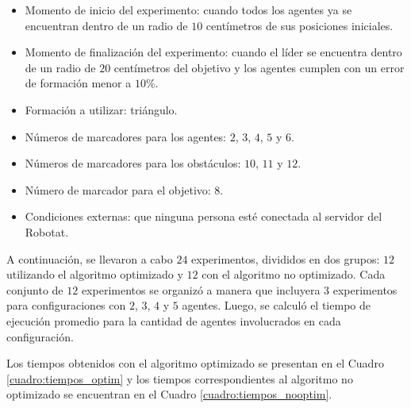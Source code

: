 \begin{itemize}
	\item Momento de inicio del experimento: cuando todos los agentes ya se encuentran dentro de un radio de $10$ centímetros de sus posiciones iniciales.
	\item  Momento de finalización del experimento: cuando el líder se encuentra dentro de un radio de $20$ centímetros del objetivo y los agentes cumplen con un error de formación menor a $10\%$. 
	\item Formación a utilizar: triángulo.
	\item Números de marcadores para los agentes: $2$, $3$, $4$, $5$ y $6$.
	\item Números de marcadores para los obstáculos: $10$, $11$ y $12$.
	\item Número de marcador para el objetivo: $8$.
	\item Condiciones externas: que ninguna persona esté conectada al servidor del Robotat.
\end{itemize}

A continuación, se llevaron a cabo $24$ experimentos, divididos en dos grupos: $12$ utilizando el algoritmo optimizado y $12$ con el algoritmo no optimizado. Cada conjunto de $12$ experimentos se organizó a manera que incluyera $3$ experimentos para configuraciones con $2$, $3$, $4$ y $5$ agentes. Luego, se calculó el tiempo de ejecución promedio para la cantidad de agentes involucrados en cada configuración.

Los tiempos obtenidos con el algoritmo optimizado se presentan en el Cuadro \ref{cuadro:tiempos_optim} y los tiempos correspondientes al algoritmo no optimizado se encuentran en el Cuadro \ref{cuadro:tiempos_nooptim}.

